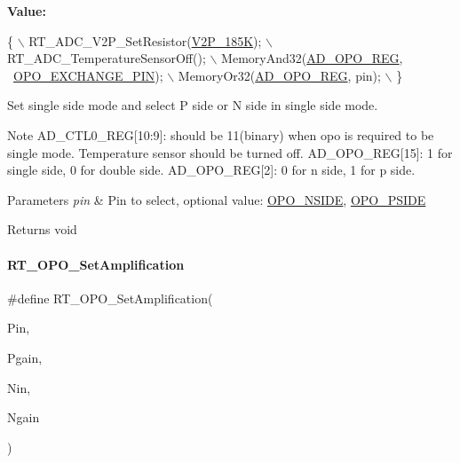 {\bfseries Value\+:}
\begin{DoxyCode}
\{                                               \(\backslash\)
        RT\_ADC\_V2P\_SetResistor(\mbox{\hyperlink{a00002_a80255c41c3764feff9b79664f15feb46aa035ba8725fe8565c5505a295c22ea8e}{V2P\_185K}});           \(\backslash\)
        RT\_ADC\_TemperatureSensorOff();              \(\backslash\)
        MemoryAnd32(\mbox{\hyperlink{a00020_aeca2931f15b40d772a94a66e4641619e}{AD\_OPO\_REG}}, ~\mbox{\hyperlink{a00002_af0663f5e9fee7a904ad95d1a4ecdaebda8866b250a87989e76add11875358e4ae}{OPO\_EXCHANGE\_PIN}}); \(\backslash\)
        MemoryOr32(\mbox{\hyperlink{a00020_aeca2931f15b40d772a94a66e4641619e}{AD\_OPO\_REG}}, pin);                \(\backslash\)
    \}
\end{DoxyCode}


Set single side mode and select P side or N side in single side mode. 

\begin{DoxyNote}{Note}
A\+D\+\_\+\+C\+T\+L0\+\_\+\+R\+EG\mbox{[}10\+:9\mbox{]}\+: should be 11(binary) when opo is required to be single mode. Temperature sensor should be turned off. A\+D\+\_\+\+O\+P\+O\+\_\+\+R\+EG\mbox{[}15\mbox{]}\+: 1 for single side, 0 for double side. A\+D\+\_\+\+O\+P\+O\+\_\+\+R\+EG\mbox{[}2\mbox{]}\+: 0 for n side, 1 for p side. 
\end{DoxyNote}

\begin{DoxyParams}{Parameters}
{\em pin} & Pin to select, optional value\+: \mbox{\hyperlink{a00002_afb2207320139ac264d5cc1600d3cae9eafd1c5b2cbd5e5a8866364e6af2dbd4c0}{O\+P\+O\+\_\+\+N\+S\+I\+DE}}, \mbox{\hyperlink{a00002_afb2207320139ac264d5cc1600d3cae9ea740f1053bc0489a53c4cfe9bfc3de403}{O\+P\+O\+\_\+\+P\+S\+I\+DE}} \\
\hline
\end{DoxyParams}
\begin{DoxyReturn}{Returns}
void 
\end{DoxyReturn}
\mbox{\label{a00002_ab2a6c21c91c7f05f3de9fefbd30ff95b}} 
\paragraph{\texorpdfstring{R\+T\+\_\+\+O\+P\+O\+\_\+\+Set\+Amplification}{RT\_OPO\_SetAmplification}}
{\footnotesize\ttfamily \#define R\+T\+\_\+\+O\+P\+O\+\_\+\+Set\+Amplification(\begin{DoxyParamCaption}\item[{}]{Pin,  }\item[{}]{Pgain,  }\item[{}]{Nin,  }\item[{}]{Ngain }\end{DoxyParamCaption})}

